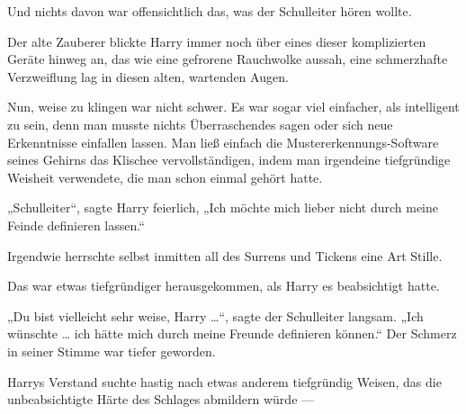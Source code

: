 Und nichts davon war offensichtlich das, was der Schulleiter hören wollte.

Der alte Zauberer blickte Harry immer noch über eines dieser komplizierten Geräte hinweg an, das wie eine gefrorene Rauchwolke aussah, eine schmerzhafte Verzweiflung lag in diesen alten, wartenden Augen.

Nun, weise zu klingen war nicht schwer. Es war sogar viel einfacher, als intelligent zu sein, denn man musste nichts Überraschendes sagen oder sich neue Erkenntnisse einfallen lassen. Man ließ einfach die Mustererkennungs-Software seines Gehirns das Klischee vervollständigen, indem man irgendeine tiefgründige Weisheit verwendete, die man schon einmal gehört hatte.

„Schulleiter“, sagte Harry feierlich,
„Ich möchte mich lieber nicht durch meine Feinde definieren lassen.“

Irgendwie herrschte selbst inmitten all des Surrens und Tickens eine Art Stille.

Das war etwas tiefgründiger herausgekommen, als Harry es beabsichtigt hatte.

„Du bist vielleicht sehr weise, Harry …“, sagte der Schulleiter langsam.
„Ich wünschte … ich hätte mich durch meine Freunde definieren können.“ Der Schmerz in seiner Stimme war tiefer geworden.

Harrys Verstand suchte hastig nach etwas anderem tiefgründig Weisen, das die unbeabsichtigte Härte des Schlages abmildern würde —

